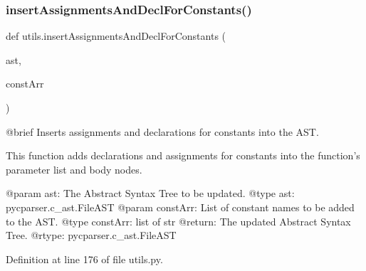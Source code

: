 \subsubsection{\texorpdfstring{insert\+Assignments\+And\+Decl\+For\+Constants()}{insertAssignmentsAndDeclForConstants()}}
{\footnotesize\ttfamily def utils.\+insert\+Assignments\+And\+Decl\+For\+Constants (\begin{DoxyParamCaption}\item[{}]{ast,  }\item[{}]{const\+Arr }\end{DoxyParamCaption})}

\begin{DoxyVerb}@brief Inserts assignments and declarations for constants into the AST.

This function adds declarations and assignments for constants into the function's parameter list and body nodes.

@param ast: The Abstract Syntax Tree to be updated.
@type ast: pycparser.c_ast.FileAST
@param constArr: List of constant names to be added to the AST.
@type constArr: list of str
@return: The updated Abstract Syntax Tree.
@rtype: pycparser.c_ast.FileAST
\end{DoxyVerb}
 

Definition at line 176 of file utils.\+py.


